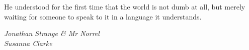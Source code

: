 \cleardoublepage
\thispagestyle{plain}
\epigraph{He understood for the first time that the world is not dumb at all, but merely waiting for someone to speak to it in a language it understands.}{\emph{Jonathan Strange \& Mr Norrel \\ Susanna Clarke}}